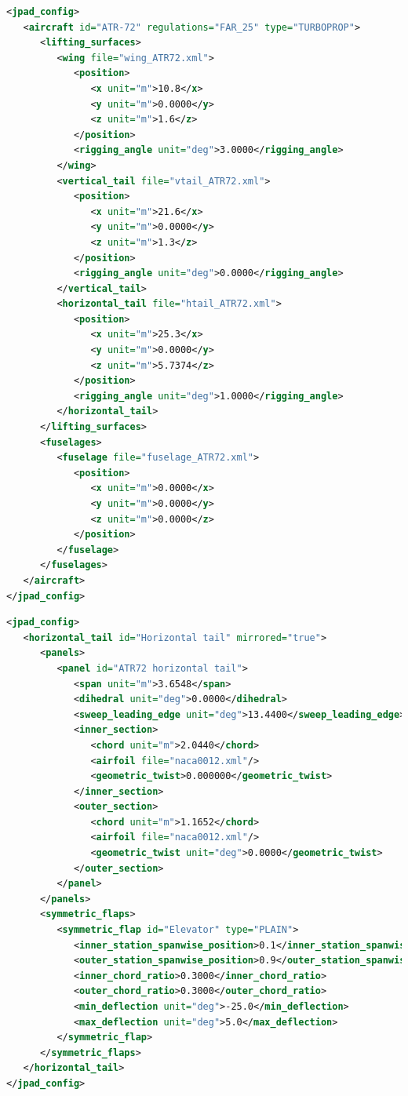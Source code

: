 \bigskip
\begin{lstlisting}[caption={Example of JPAD aircraft XML file}, captionpos=b, tabsize=6, language=XML, label={lst:AircraftXML}]
<jpad_config>
   <aircraft id="ATR-72" regulations="FAR_25" type="TURBOPROP">
      <lifting_surfaces>
         <wing file="wing_ATR72.xml">
            <position>
               <x unit="m">10.8</x>
               <y unit="m">0.0000</y>
               <z unit="m">1.6</z>
            </position>
            <rigging_angle unit="deg">3.0000</rigging_angle>
         </wing>
         <vertical_tail file="vtail_ATR72.xml">
            <position>
               <x unit="m">21.6</x>
               <y unit="m">0.0000</y>
               <z unit="m">1.3</z>
            </position>
            <rigging_angle unit="deg">0.0000</rigging_angle>
         </vertical_tail>
         <horizontal_tail file="htail_ATR72.xml">
            <position>
               <x unit="m">25.3</x>
               <y unit="m">0.0000</y>
               <z unit="m">5.7374</z>
            </position>
            <rigging_angle unit="deg">1.0000</rigging_angle>
         </horizontal_tail>
      </lifting_surfaces>
      <fuselages>
         <fuselage file="fuselage_ATR72.xml">
            <position>
               <x unit="m">0.0000</x>
               <y unit="m">0.0000</y>
               <z unit="m">0.0000</z>
            </position>
         </fuselage>
      </fuselages>
   </aircraft>
</jpad_config>
\end{lstlisting}

\bigskip
\begin{lstlisting}[caption={Example of JPAD lifting surface XML file}, captionpos=b, tabsize=6, language=XML, label={lst:HTailXML}]
<jpad_config>
   <horizontal_tail id="Horizontal tail" mirrored="true">
      <panels>
         <panel id="ATR72 horizontal tail">
            <span unit="m">3.6548</span>
            <dihedral unit="deg">0.0000</dihedral>
            <sweep_leading_edge unit="deg">13.4400</sweep_leading_edge>
            <inner_section>
               <chord unit="m">2.0440</chord>
               <airfoil file="naca0012.xml"/>
               <geometric_twist>0.000000</geometric_twist>
            </inner_section>
            <outer_section>
               <chord unit="m">1.1652</chord>
               <airfoil file="naca0012.xml"/>
               <geometric_twist unit="deg">0.0000</geometric_twist>
            </outer_section>
         </panel>
      </panels>
      <symmetric_flaps>
         <symmetric_flap id="Elevator" type="PLAIN">
            <inner_station_spanwise_position>0.1</inner_station_spanwise_position>
            <outer_station_spanwise_position>0.9</outer_station_spanwise_position>
            <inner_chord_ratio>0.3000</inner_chord_ratio>
            <outer_chord_ratio>0.3000</outer_chord_ratio>
            <min_deflection unit="deg">-25.0</min_deflection>
            <max_deflection unit="deg">5.0</max_deflection>
         </symmetric_flap>
      </symmetric_flaps>
   </horizontal_tail>
</jpad_config>
\end{lstlisting}

